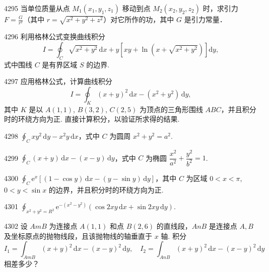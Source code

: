 \begin{prob}[M]{4295}
当单位质量从点 $M_1(x_1,y_1,z_1)$ 移动到点 $M_2(x_2,y_2,z_2)$ 时，求引力 $F = \frac{G}{r^2}$（其中 $r = \sqrt{x^2+y^2+z^2}$）对它所作的功，其中 $G$ 是引力常量．
\end{prob}


\begin{prob}[M]{4296}
利用格林公式变换曲线积分
\[
I = \oint_C \sqrt{x^2 + y^2}\,\mathrm{d}x + y \left[ xy + \ln\left( x + \sqrt{x^2 + y^2} \right) \right] \mathrm{d}y,
\]
式中围线 $C$ 是有界区域 $S$ 的边界.
\end{prob}

\begin{prob}[M]{4297}
应用格林公式，计算曲线积分
\[
I = \oint_K (x + y)^2\,\mathrm{d}x - (x^2 + y^2)\,\mathrm{d}y,
\]
其中 $K$ 是以 $A(1,1)$, $B(3,2)$, $C(2,5)$ 为顶点的三角形围线 $ABC$，并且积分时的环绕方向为正. 直接计算积分，以验证所求得的结果.
\end{prob}


\begin{prob}[S]{4298}
$\oint_C xy^2\,\mathrm{d}y - x^2 y\,\mathrm{d}x$，式中 $C$ 为圆周 $x^2 + y^2 = a^2$.
\end{prob}

\begin{prob}[S]{4299}
$\oint_C (x + y)\,\mathrm{d}x - (x - y)\,\mathrm{d}y$，式中 $C$ 为椭圆 $\dfrac{x^2}{a^2} + \dfrac{y^2}{b^2} = 1$.
\end{prob}

\begin{prob}[M]{4300}
$\oint_C \mathrm{e}^x [(1 - \cos y)\,\mathrm{d}x - (y - \sin y)\,\mathrm{d}y]$，其中 $C$ 为区域 $0 < x < \pi$, $0 < y < \sin x$ 的边界，并且积分时的环绕方向为正.
\end{prob}

\begin{prob}[S]{4301}
$\oint_{x^2+y^2=R^2} \mathrm{e}^{-(x^2-y^2)} (\cos 2xy\,\mathrm{d}x + \sin 2xy\,\mathrm{d}y)$.
\end{prob}

\begin{prob}[M]{4302}
设 $AmB$ 为连接点 $A(1,1)$ 和点 $B(2,6)$ 的直线段，$AnB$ 是连接点 $A, B$ 及坐标原点的抛物线段，且该抛物线的轴垂直于 $x$ 轴. 积分
\[
I_1 = \int_{AmB} (x + y)^2\,\mathrm{d}x - (x - y)^2\,\mathrm{d}y, \quad I_2 = \int_{AnB} (x + y)^2\,\mathrm{d}x - (x - y)^2\,\mathrm{d}y
\]
相差多少？
\end{prob}

